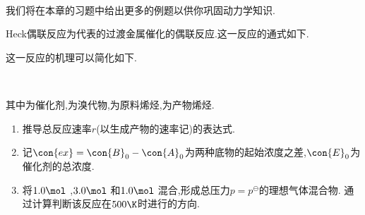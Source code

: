 \documentclass{ctexart}
\begin{document}
\pagestyle{plain}
\noindent{}\vspace{15pt}\\
\indent 我们将在本章的习题中给出更多的例题以供你巩固动力学知识.
\setcounter{Pcounter}{0}
\begin{problem}
    Heck偶联反应为代表的过渡金属催化的偶联反应.这一反应的通式如下.
    \begin{tightcenter}
    \end{tightcenter}
    这一反应的机理可以简化如下.
    \begin{tightcenter}
         \\
    \end{tightcenter}
    其中为催化剂,为溴代物,为原料烯烃,为产物烯烃.
    \begin{enumerate}[label=\tbf{\arabic{Pcounter}-\arabic*},topsep=0pt,parsep=0pt,itemsep=0pt,partopsep=0pt]
        \item 推导总反应速率$r$(以生成产物的速率记)的表达式.
        \item 记$\con{ex}=\con{B}_0-\con{A}_0$为两种底物的起始浓度之差,$\con{E}_0$为催化剂的总浓度.
        \item 将$1.0\mol$ ,$3.0\mol$ 和$1.0\mol$ 混合,形成总压力$p=p^\ominus$的理想气体混合物.%
            通过计算判断该反应在$500\K$时进行的方向.
    \end{enumerate}
\end{problem}
\end{document}
